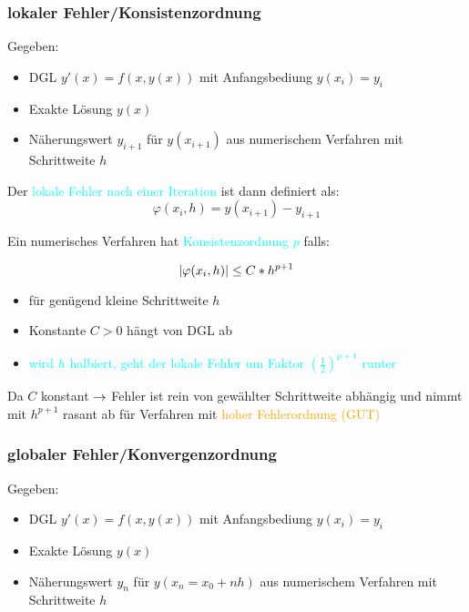 \subsubsection{lokaler Fehler/Konsistenzordnung}

Gegeben:
\begin{itemize}
	\item DGL $y'(x) = f(x, y(x))$ mit Anfangsbediung $y(x_i) = y_i$
	\item Exakte Lösung $y(x)$
	\item Näherungswert $y_{i+1}$ für $y(x_{i+1})$ aus numerischem
	      Verfahren mit Schrittweite $h$
\end{itemize}


Der \textcolor{cyan}{lokale Fehler nach einer Iteration} ist dann definiert als:
$$\varphi(x_i, h) = y(x_{i+1}) - y_{i+1}$$

\begingroup
Ein numerisches Verfahren hat \textcolor{cyan}{Konsistenzordnung $p$} falls:
\large
\begin{multicols}{2}
	$$|\varphi(x_i, h)| \le C * h^{p+1}
    \vspace{\fill} 
    $$
    \columnbreak
    \begin{itemize}
        \item für genügend kleine Schrittweite $h$
        \item Konstante $C > 0$ hängt von DGL ab
        \item \textcolor{cyan}{wird $h$ halbiert, geht der lokale Fehler
            um Faktor $(\frac{1}{2})^{p+1}$ runter}
    \end{itemize}
\end{multicols}
\endgroup

Da $C$ konstant $\rightarrow$ Fehler ist rein von gewählter Schrittweite abhängig
und nimmt mit $h^{p+1}$ rasant ab für Verfahren mit 
\textcolor{orange}{hoher Fehlerordnung (GUT)}


\subsubsection{globaler Fehler/Konvergenzordnung}


Gegeben:
\begin{itemize}
	\item DGL $y'(x) = f(x, y(x))$ mit Anfangsbediung $y(x_i) = y_i$
	\item Exakte Lösung $y(x)$
	\item Näherungswert $y_n$ für $y(x_n=x_0 + n h)$ aus numerischem
	      Verfahren mit Schrittweite $h$
\end{itemize}

